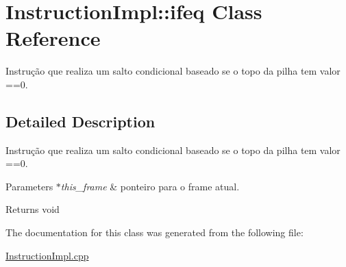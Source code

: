 \hypertarget{class_instruction_impl_1_1ifeq}{}\section{Instruction\+Impl\+:\+:ifeq Class Reference}
\label{class_instruction_impl_1_1ifeq}


Instrução que realiza um salto condicional baseado se o topo da pilha tem valor ==0.  




\subsection{Detailed Description}
Instrução que realiza um salto condicional baseado se o topo da pilha tem valor ==0. 


\begin{DoxyParams}{Parameters}
{\em $\ast$this\+\_\+frame} & ponteiro para o frame atual. \\
\hline
\end{DoxyParams}
\begin{DoxyReturn}{Returns}
void 
\end{DoxyReturn}


The documentation for this class was generated from the following file\+:\begin{DoxyCompactItemize}
\item 
\hyperlink{_instruction_impl_8cpp}{Instruction\+Impl.\+cpp}\end{DoxyCompactItemize}
